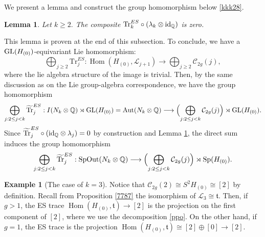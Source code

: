 \documentclass{article}
\theoremstyle{plain}
\newtheorem{lem}[thm]{Lemma}
\theoremstyle{definition}
\newtheorem{exa}[thm]{Example}
\def\Hom{\mathop{\mathrm{Hom}}\nolimits}
\newcommand{\lra}{\longrightarrow}
\newcommand{\ra}{\rightarrow}
\newcommand{\Q}{{\Bbb Q}}
\newcommand{\Aut}{{\rm Aut}}
\newcommand{\Sp}{{\rm Sp}}
\newcommand{\GL}{{\rm GL}}
\newcommand{\SpOut}{{\rm SpOut}}
\newcommand{\id}{{\mathrm{id}}}
\begin{document}
{We present a lemma and construct the group homomorphism below \eqref{kkk28}.

\begin{lem}\label{lem4933}
Let $ k\geq 2.$ The composite $ \mathrm{Tr}_{k}^{ES} \circ ( \lambda_k \otimes \id_{\Q} ) $ is zero.
\end{lem}
\noindent
This lemma is proven at the end of this subsection. To conclude, we have a $\GL(H_{(0 )}) $-equivariant Lie homomorphism:
\[\bigoplus_{j \geq 2 }\mathrm{Tr}_{j}^{ES} : \Hom( H_{(0)}, \mathcal{L}_{j+1}) \lra \bigoplus_{j \geq 2} \mathcal{C}_{2g}(j) , \]
where the lie algebra structure of the image is trivial. Then, by the same discussion as \cite[Section 3]{Mo2} on the Lie group-algebra correspondence, we have the group homomorphism
\[ \bigoplus_{j: 2 \leq j <k} \widetilde{\mathrm{Tr}}_{j}^{ES} : I(N_k \otimes \Q) \rtimes \GL(H_{(0)}) = \Aut(N_{k} \otimes \Q) \lra \Bigl( \bigoplus_{j : 2 \leq j < k} \mathcal{C}_{2g}(j) \Bigr) \rtimes \GL(H_{(0)}). \]
Since $ \widetilde{\mathrm{Tr}}_{j}^{ES} \circ ( \id_{\Q} \otimes \lambda_j ) =0$ by construction and Lemma \ref{lem4933}, the direct sum induces the group homomorphism
\begin{equation}\label{kkk28}\bigoplus_{j: 2 \leq j <k} \widetilde{\mathrm{Tr}}_{j}^{ES} :\SpOut(N_{k} \otimes \Q) \lra \Bigl( \bigoplus_{j : 2 \leq j < k} \mathcal{C}_{2g}(j) \Bigr) \rtimes \Sp(H_{(0)}).\end{equation}

\begin{exa}
[{The case of $k=3$}]\label{exko} Notice that $\mathcal{C}_{2g}(2) \cong S^2 H_{(0)} \cong [2] $ by definition. Recall from Proposition \ref{7787} the isomorphism of $ \mathcal{L}_3 \cong \mathfrak{t}$. Then, if $g>1$, the ES trace $\Hom (H_{(0)}, \mathfrak{t}) \ra [2]$ is the projection on the first component of $[2]$, where we use the decomposition \eqref{ppo}. On the other hand, if $g=1$, the ES trace is the projection $ \Hom (H_{(0)}, \mathfrak{t})\cong [2] \oplus [0] \ra [2] $.
\end{exa}

}
\end{document}
